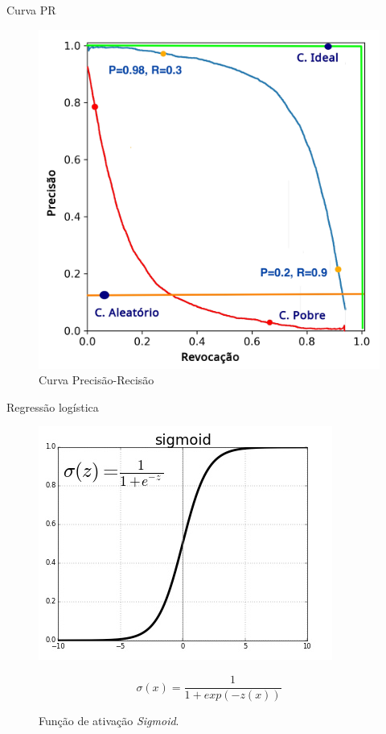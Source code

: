 \documentclass[8pt]{beamer}
\begin{document}
\begin{frame}{Curva PR}
    \begin{figure}[!ht]
        \centering
        \includegraphics[width=0.5\columnwidth]{Imagens/pr_curve_orig.jpg}
        \caption{Curva Precisão-Recisão}
    \end{figure}
\end{frame}  

\begin{frame}{Regressão logística}
    \begin{figure}[!ht]
        \centering
        \begin{minipage}[c]{0.4\textwidth}
            \includegraphics[width=\columnwidth]{Imagens/sigmoid-activation-function.jpg}
        \end{minipage}%
        \begin{minipage}{0.5\textwidth}
            \begin{equation} \sigma(x) = \frac{1} {1+ exp(-z(x))}\end{equation}
        \end{minipage}       
        \label{fig:sigmoid}
        \caption{Função de ativação \textit{Sigmoid}.}
    \end{figure}
\end{frame}
\end{document}
